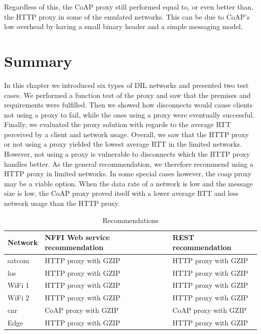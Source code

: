 Regardless of this, the CoAP proxy still performed equal to, or even better
than, the HTTP proxy in some of the emulated networks. This can be due to CoAP's
low overhead by having a small binary header and a simple messaging model.


\section{Summary}

In this chapter we introduced six types of DIL networks and presented two test
cases. We performed a function test of the proxy and saw that the premises and
requirements were fulfilled. Then we showed how disconnects would cause clients
not using a proxy to fail, while the ones using a proxy were eventually
successful. Finally, we evaluated the proxy solution with regards to the average
RTT perceived by a client and network usage. Overall, we saw that the HTTP proxy
or not using a proxy yielded the lowest average RTT in the limited networks.
However, not using a proxy is vulnerable to disconnects which the HTTP proxy
handles better. As the general recommendation, we therefore recommend using a
HTTP proxy in limited networks. In some special cases however, the \gls{coap} proxy
may be a viable option. When the data rate of a network is low and the message
size is low, the CoAP proxy proved itself with a lower average RTT and less
network usage than the HTTP proxy.

\begin{table}[h]
\begin{tabular}{| l | l | l |}
\hline
  \textbf{Network} & \textbf{NFFI Web service recommendation} & \textbf{REST recommendation}\\ \hline
  \gls{satcom} & HTTP proxy with GZIP & HTTP proxy with GZIP \\ \hline
  \gls{los} & HTTP proxy with GZIP  & HTTP proxy with GZIP \\ \hline
  WiFi 1 & HTTP proxy with GZIP & HTTP proxy with GZIP \\ \hline
  WiFi 2 & HTTP proxy with GZIP & HTTP proxy with GZIP \\ \hline
  \gls{cnr} & CoAP proxy with GZIP & CoAP proxy with GZIP \\ \hline
  Edge & HTTP proxy with GZIP & HTTP proxy with GZIP \\ \hline
\end{tabular}
\caption{Recommendations}
\label{table-evaluation-summary}
\end{table}
